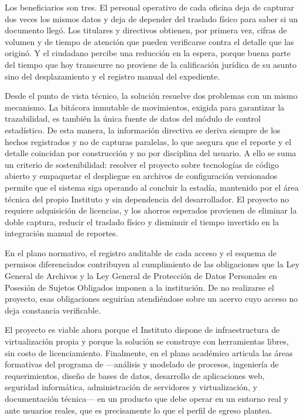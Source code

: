 Los beneficiarios son tres. El personal operativo de cada oficina deja de capturar dos veces los mismos datos y deja de depender del traslado físico para saber si un documento llegó. Los titulares y directivos obtienen, por primera vez, cifras de volumen y de tiempo de atención que pueden verificarse contra el detalle que las originó. Y el ciudadano percibe una reducción en la espera, porque buena parte del tiempo que hoy transcurre no proviene de la calificación jurídica de su asunto sino del desplazamiento y el registro manual del expediente.

Desde el punto de vista técnico, la solución resuelve dos problemas con un mismo mecanismo. La bitácora inmutable de movimientos, exigida para garantizar la trazabilidad, es también la única fuente de datos del módulo de control estadístico. De esta manera, la información directiva se deriva siempre de los hechos registrados y no de capturas paralelas, lo que asegura que el reporte y el detalle coincidan por construcción y no por disciplina del usuario. A ello se suma un criterio de sostenibilidad: resolver el proyecto sobre tecnologías de código abierto y empaquetar el despliegue en archivos de configuración versionados permite que el sistema siga operando al concluir la estadía, mantenido por el área técnica del propio Instituto y sin dependencia del desarrollador. El proyecto no requiere adquisición de licencias, y los ahorros esperados provienen de eliminar la doble captura, reducir el traslado físico y disminuir el tiempo invertido en la integración manual de reportes.

En el plano normativo, el registro auditable de cada acceso y el esquema de permisos diferenciados contribuyen al cumplimiento de las obligaciones que la Ley General de Archivos \cite{lga2018} y la Ley General de Protección de Datos Personales en Posesión de Sujetos Obligados \cite{lgpdppso2017} imponen a la institución. De no realizarse el proyecto, esas obligaciones seguirían atendiéndose sobre un acervo cuyo acceso no deja constancia verificable.

El proyecto es viable ahora porque el Instituto dispone de infraestructura de virtualización propia y porque la solución se construye con herramientas libres, sin costo de licenciamiento. Finalmente, en el plano académico articula las áreas formativas del programa de \ncarrera{} —análisis y modelado de procesos, ingeniería de requerimientos, diseño de bases de datos, desarrollo de aplicaciones web, seguridad informática, administración de servidores y virtualización, y documentación técnica— en un producto que debe operar en un entorno real y ante usuarios reales, que es precisamente lo que el perfil de egreso plantea.

